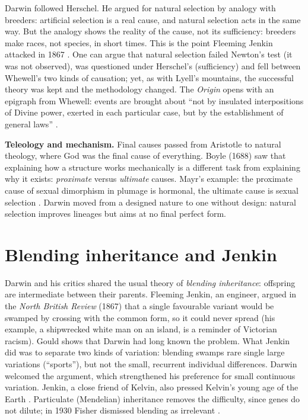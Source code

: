Darwin followed Herschel. He argued for
natural selection by analogy with breeders:
artificial selection is a real cause, and
natural selection acts in the same way.
But the analogy shows the reality of the
cause, not its sufficiency: breeders make
races, not species, in short times. This
is the point Fleeming Jenkin attacked in
1867 \cite{guillaumin-vera-causa}. One
can argue that natural
selection failed Newton's test (it was not
observed), was questioned under Herschel's
(sufficiency) and fell between Whewell's
two kinds of causation; yet, as with
Lyell's mountains, the successful theory
was kept and the methodology changed. The
\emph{Origin} opens with an epigraph from
Whewell: events are brought about ``not by
insulated interpositions of Divine power,
exerted in each particular case, but by
the establishment of general laws''
\cite{darwin2008origin}.

\textbf{Teleology and mechanism.} Final
causes passed from Aristotle to natural
theology, where God was the final cause of
everything. Boyle (1688) saw that
explaining how a structure works
mechanically is a different task from
explaining why it exists: \emph{proximate}
versus \emph{ultimate} causes. Mayr's
example: the proximate cause of sexual
dimorphism in plumage is hormonal, the
ultimate cause is sexual selection
\cite{mayr-fisicos}. Darwin moved from a
designed nature to one without design:
natural selection improves lineages but
aims at no final perfect form.

\section{Blending inheritance and Jenkin}
\label{section-blending}

Darwin and his critics shared the usual
theory of \emph{blending inheritance}:
offspring are intermediate between their
parents. Fleeming Jenkin, an engineer,
argued in the \emph{North British Review}
(1867) that a single favourable variant
would be swamped by crossing with the
common form, so it could never spread
(his example, a shipwrecked white man on
an island, is a reminder of Victorian
racism). Gould shows that Darwin had long
known the problem. What Jenkin did was to
separate two kinds of variation: blending
swamps rare single large variations
(``sports''), but not the small,
recurrent individual differences. Darwin
welcomed the argument, which strengthened
his preference for small continuous
variation. Jenkin, a close friend of
Kelvin, also pressed Kelvin's young age of
the Earth \cite{gould-jenkin}. Particulate
(Mendelian) inheritance removes the
difficulty, since genes do not dilute; in
1930 Fisher dismissed blending as
irrelevant \cite{kingsland-neodarwinismo}.

